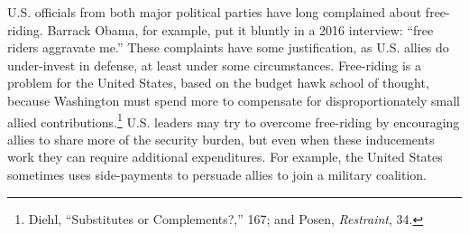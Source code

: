 U.S. officials from both major political parties have long complained about free-riding.  Barrack Obama, for example, put it bluntly in a 2016 interview: ``free riders aggravate me.''\autocite[Quoted in][]{goldbergA16} These complaints have some justification, as U.S. allies do under-invest in defense, at least under some circumstances.\autocite[See, for example,][]{PluemperNeumayer2015, Fuhrmann2020} Free-riding is a problem for the United States, based on the budget hawk school of thought, because Washington must spend more to compensate for disproportionately small allied contributions.\footnote{Diehl, ``Substitutes or Complements?,'' 167; and Posen, \textit{Restraint}, 34.} U.S. leaders may try to overcome free-riding by encouraging allies to share more of the security burden, but even when these inducements work they can require additional expenditures. For example, the United States sometimes uses side-payments to persuade allies to join a military coalition.\autocite[3]{wolfordpolitics16} %


